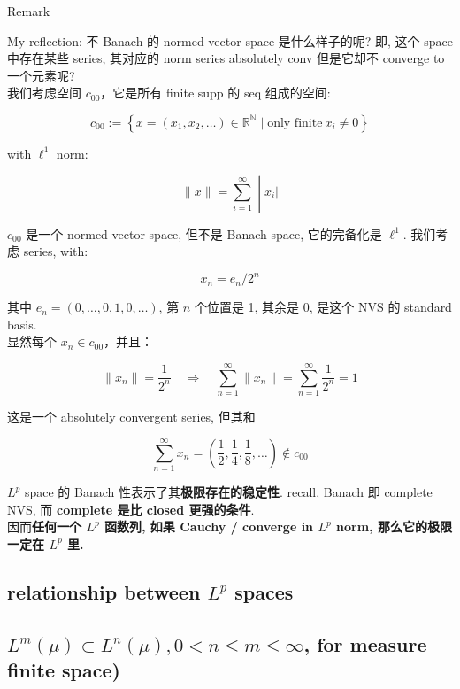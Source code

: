 \documentclass{qlnotes-export}
\begin{document}
\begin{qlremark}{Remark}

My reflection: 不 Banach 的 normed vector space 是什么样子的呢? 即, 这个 space 中存在某些 series, 其对应的 norm series absolutely conv 但是它却不 converge to 一个元素呢?\\
我们考虑空间 \(c_{00}\)，它是所有 finite supp 的 seq 组成的空间:

\[c_{00} := \left\{ {x = (x_{1},x_{2},\ldots) \in {\mathbb{R}}^{\mathbb{N}} \mid \text{only finite}\ x_{i} \neq 0} \right\}\]

with \(\ell^{1}\) norm:

\[\left. \parallel x \parallel = \sum\limits_{i = 1}^{\infty} \middle| x_{i}| \right.\]

\(c_{00}\) 是一个 normed vector space, 但不是 Banach space, 它的完备化是 \(\ell^{1}\). 我们考虑 series, with:

\[x_{n} = e_{n}/2^{n}\]

其中 \(e_{n} = (0,\ldots,0,1,0,\ldots)\), 第 \(n\) 个位置是 1, 其余是 \(0\), 是这个 NVS 的 standard basis.\\
显然每个 \(x_{n} \in c_{00}\)，并且：

\[\parallel x_{n} \parallel = \frac{1}{2^{n}}\quad\Rightarrow\quad\sum\limits_{n = 1}^{\infty} \parallel x_{n} \parallel = \sum\limits_{n = 1}^{\infty}\frac{1}{2^{n}} = 1\]

这是一个 absolutely convergent series, 但其和

\[\sum\limits_{n = 1}^{\infty}x_{n} = \left( {\frac{1}{2},\frac{1}{4},\frac{1}{8},\ldots} \right) \notin c_{00}\]

\(L^{p}\) space 的 Banach 性表示了其\textbf{极限存在的稳定性}. recall, Banach 即 complete NVS, 而 \textbf{complete 是比 closed 更强的条件}.\\
因而\textbf{任何一个 \(L^{p}\) 函数列, 如果 Cauchy / converge in \(L^{p}\) norm, 那么它的极限一定在 \(L^{p}\) 里.}

\end{qlremark}

\subsection{\texorpdfstring{relationship between \(L^{p}\) spaces}{relationship between L\^{}\{p\} spaces}}\label{relationship-between-lp-spaces}

\subsection{\texorpdfstring{\(L^{m}(\mu) \subset L^{n}(\mu),0 < n \leq m \leq \infty\), for measure finite space)}{L\^{}\{m\}(\textbackslash mu) \textbackslash subset L\^{}\{n\}(\textbackslash mu),0 \textless{} n \textbackslash leq m \textbackslash leq \textbackslash infty, for measure finite space)}}\label{lmmu-subset-lnmu0-n-leq-m-leq-infty-for-measure-finite-space}
\end{document}
